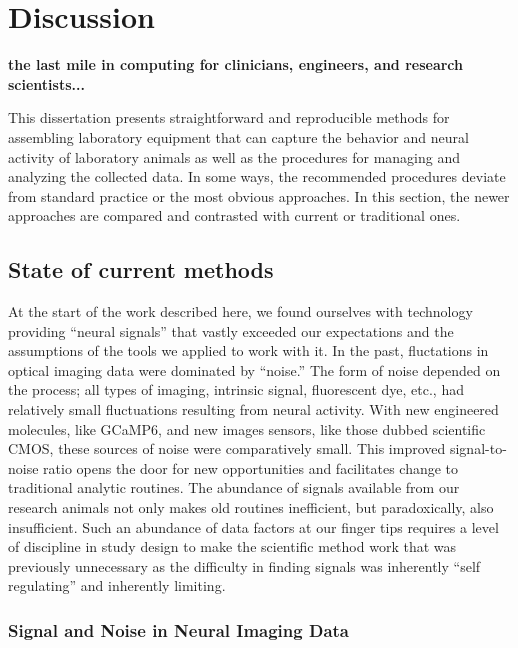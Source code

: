 \chapter{Discussion}
\label{chapter:discussion-the-last-mile-in-computing-for-clinicians-engineers-and-research-scientists}
\thispagestyle{myheadings}


\textbf{the last mile in computing for clinicians,
engineers, and research
scientists...}

This dissertation presents straightforward and reproducible methods for assembling laboratory equipment that can capture the behavior and neural activity of laboratory animals as well as the procedures for managing and analyzing the collected data. In some ways, the recommended procedures deviate from standard practice or the most obvious approaches. In this section, the newer approaches are compared and contrasted with current or traditional ones.

\section{State of current methods}\label{state-of-current-methods}

At the start of the work described here, we found ourselves with technology providing “neural signals” that vastly exceeded our expectations and the assumptions of the tools we applied to work with it. In the past, fluctations in optical imaging data were dominated by “noise.” The form of noise depended on the process; all types of imaging, intrinsic signal, fluorescent dye, etc., had relatively small fluctuations resulting from neural activity. With new engineered molecules, like GCaMP6, and new images sensors, like those dubbed scientific CMOS, these sources of noise were comparatively small. This improved signal-to-noise ratio opens the door for new opportunities and facilitates change to traditional analytic routines. The abundance of signals available from our research animals not only makes old routines inefficient, but paradoxically, also insufficient. Such an abundance of data factors at our finger tips requires a level of discipline in study design to make the scientific method work that was previously unnecessary as the difficulty in finding signals was inherently “self regulating” and inherently limiting.

\subsection{Signal and Noise in Neural Imaging
Data}\label{signal-and-noise-in-neural-imaging-data}

